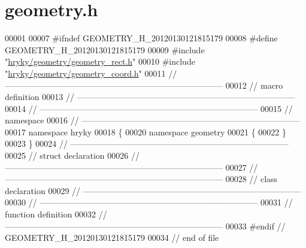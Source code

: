 \hypertarget{geometry_8h_source}{\section{geometry.\-h}
}

\begin{DoxyCode}
00001 
00007 \textcolor{preprocessor}{#ifndef GEOMETRY\_H\_20120130121815179}
00008 \textcolor{preprocessor}{}\textcolor{preprocessor}{#define GEOMETRY\_H\_20120130121815179}
00009 \textcolor{preprocessor}{}\textcolor{preprocessor}{#include "\hyperlink{geometry__rect_8h}{hryky/geometry/geometry_rect.h}"}
00010 \textcolor{preprocessor}{#include "\hyperlink{geometry__coord_8h}{hryky/geometry/geometry_coord.h}"}
00011 \textcolor{comment}{//
      ------------------------------------------------------------------------------}
00012 \textcolor{comment}{// macro definition}
00013 \textcolor{comment}{//
      ------------------------------------------------------------------------------}
00014 \textcolor{comment}{//
      ------------------------------------------------------------------------------}
00015 \textcolor{comment}{// namespace}
00016 \textcolor{comment}{//
      ------------------------------------------------------------------------------}
00017 \textcolor{keyword}{namespace }hryky
00018 \{
00020 \textcolor{keyword}{namespace }geometry
00021 \{
00022 \}
00023 \}
00024 \textcolor{comment}{//
      ------------------------------------------------------------------------------}
00025 \textcolor{comment}{// struct declaration}
00026 \textcolor{comment}{//
      ------------------------------------------------------------------------------}
00027 \textcolor{comment}{//
      ------------------------------------------------------------------------------}
00028 \textcolor{comment}{// class declaration}
00029 \textcolor{comment}{//
      ------------------------------------------------------------------------------}
00030 \textcolor{comment}{//
      ------------------------------------------------------------------------------}
00031 \textcolor{comment}{// function definition}
00032 \textcolor{comment}{//
      ------------------------------------------------------------------------------}
00033 \textcolor{preprocessor}{#endif // GEOMETRY\_H\_20120130121815179}
00034 \textcolor{preprocessor}{}\textcolor{comment}{// end of file}
\end{DoxyCode}
